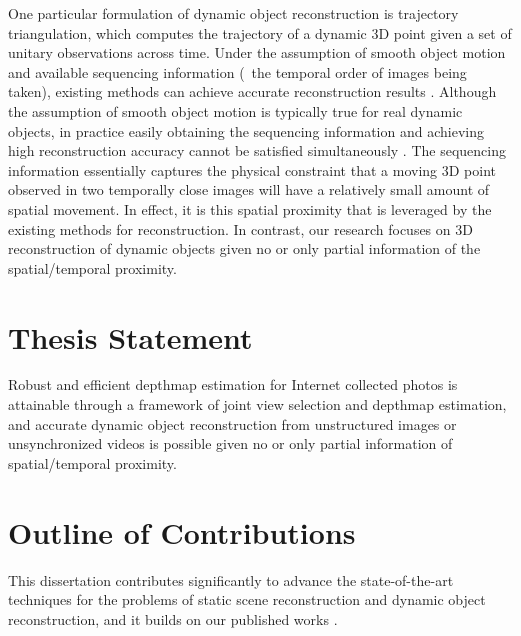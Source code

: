 One particular formulation of dynamic object reconstruction is trajectory triangulation, which computes the trajectory of a dynamic 3D point given a set of unitary observations across time. Under the assumption of smooth object motion and available sequencing information (\ie~the temporal order of images being taken), existing methods can achieve accurate reconstruction results \cite{Park_ECCV2010,Valmadre_CVPR2012}. Although the assumption of smooth object motion is typically true for real dynamic objects, in practice easily obtaining the sequencing information and achieving high reconstruction accuracy cannot be satisfied simultaneously \cite{ZhuCL_CVPR11,Valmadre_CVPR2012}. The sequencing information essentially captures the physical constraint that a moving 3D point observed in two temporally close images will have a relatively small amount of spatial movement. In effect, it is this spatial proximity that is leveraged by the existing methods \cite{Park_ECCV2010,Valmadre_CVPR2012} for reconstruction. In contrast, our research focuses on 3D reconstruction of dynamic objects given no or only partial information of the spatial/temporal proximity.

\section{Thesis Statement}
Robust and efficient depthmap estimation for Internet collected photos is attainable through a framework of joint view selection and depthmap estimation, and accurate dynamic object reconstruction from unstructured images or unsynchronized videos is possible given no or only partial information of spatial/temporal proximity.

\section{Outline of Contributions}
This dissertation contributes significantly to advance the state-of-the-art techniques for the problems of static scene reconstruction and dynamic object reconstruction, and it builds on our published works \cite{zheng2014patchmatch,zheng2014joint,zhengiccv_2015}.

